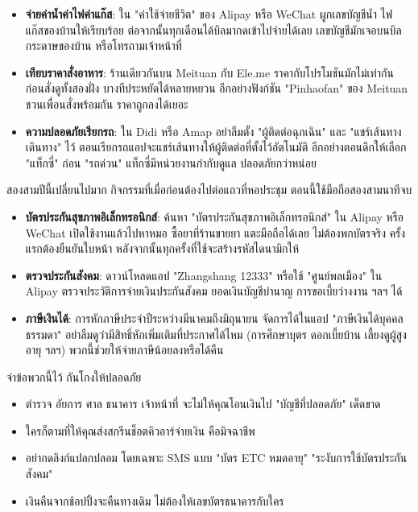 \begin{itemize}
  \item \textbf{จ่ายค่าน้ำค่าไฟค่าแก๊ส}: ใน "ค่าใช้จ่ายชีวิต" ของ Alipay หรือ WeChat ผูกเลขบัญชีน้ำ ไฟ แก๊สของบ้านให้เรียบร้อย ต่อจากนั้นทุกเดือนได้บิลมากดเข้าไปจ่ายได้เลย เลขบัญชีมักเจอบนบิลกระดาษของบ้าน หรือโทรถามเจ้าหน้าที่
  \item \textbf{เทียบราคาสั่งอาหาร}: ร้านเดียวกันบน Meituan กับ Ele.me ราคากับโปรโมชันมักไม่เท่ากัน ก่อนสั่งดูทั้งสองฝั่ง บางทีประหยัดได้หลายหยวน อีกอย่างฟังก์ชัน "Pinhaofan" ของ Meituan ชวนเพื่อนสั่งพร้อมกัน ราคาถูกลงได้เยอะ
  \item \textbf{ความปลอดภัยเรียกรถ}: ใน Didi หรือ Amap อย่าลืมตั้ง "ผู้ติดต่อฉุกเฉิน" และ "แชร์เส้นทางเดินทาง" ไว้ ตอนเรียกรถแอปจะแชร์เส้นทางให้ผู้ติดต่อที่ตั้งไว้อัตโนมัติ อีกอย่างตอนดึกให้เลือก "แท็กซี่" ก่อน "รถด่วน" แท็กซี่มีหน่วยงานกำกับดูแล ปลอดภัยกว่าหน่อย
\end{itemize}


สองสามปีนี้เปลี่ยนไปมาก กิจกรรมที่เมื่อก่อนต้องไปต่อแถวที่หอประชุม ตอนนี้ใช้มือถือสองสามนาทีจบ

\begin{itemize}
  \item \textbf{บัตรประกันสุขภาพอิเล็กทรอนิกส์}: ค้นหา "บัตรประกันสุขภาพอิเล็กทรอนิกส์" ใน Alipay หรือ WeChat เปิดใช้งานแล้วไปหาหมอ ซื้อยาที่ร้านขายยา แตะมือถือได้เลย ไม่ต้องพกบัตรจริง ครั้งแรกต้องยืนยันใบหน้า หลังจากนั้นทุกครั้งที่ใช้จะสร้างรหัสไดนามิกให้
  \item \textbf{ตรวจประกันสังคม}: ดาวน์โหลดแอป "Zhangshang 12333" หรือใช้ "ศูนย์พลเมือง" ใน Alipay ตรวจประวัติการจ่ายเงินประกันสังคม ยอดเงินบัญชีบำนาญ การขอเบี้ยว่างงาน ฯลฯ ได้
  \item \textbf{ภาษีเงินได้}: การหักภาษีประจำปีระหว่างมีนาคมถึงมิถุนายน จัดการได้ในแอป "ภาษีเงินได้บุคคลธรรมดา" อย่าลืมดูว่ามีสิทธิ์หักเพิ่มเติมที่ประกาศได้ไหม (การศึกษาบุตร ดอกเบี้ยบ้าน เลี้ยงดูผู้สูงอายุ ฯลฯ) พวกนี้ช่วยให้จ่ายภาษีน้อยลงหรือได้คืน
\end{itemize}

\begin{tcbwarn}{จำข้อพวกนี้ไว้ กันโกงให้ปลอดภัย}
\begin{itemize}
  \item ตำรวจ อัยการ ศาล ธนาคาร เจ้าหน้าที่ จะไม่ให้คุณโอนเงินไป "บัญชีที่ปลอดภัย" เด็ดขาด
  \item ใครก็ตามที่ให้คุณส่งสกรีนช็อตคิวอาร์จ่ายเงิน คือมิจฉาชีพ
  \item อย่ากดลิงก์แปลกปลอม โดยเฉพาะ SMS แบบ "บัตร ETC หมดอายุ" "ระงับการใช้บัตรประกันสังคม"
  \item เงินคืนจากช้อปปิ้งจะคืนทางเดิม ไม่ต้องให้เลขบัตรธนาคารกับใคร
\end{itemize}

\end{tcbwarn}

